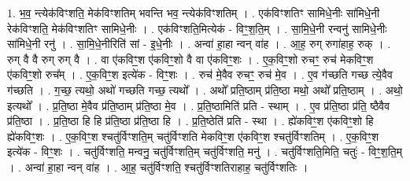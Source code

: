 \documentclass[17pt]{extarticle}
\begin{document}
1. भ॒व॒ न्त्येक॑विꣳशति॒ मेक॑विꣳशतिम् भवन्ति भव॒ न्त्येक॑विꣳशतिम् । . एक॑विꣳशतिꣳ सामिधे॒नीः सा॑मिधे॒नी रेक॑विꣳशति॒ मेक॑विꣳशतिꣳ सामिधे॒नीः । . एक॑विꣳशति॒मित्येक॑ - विꣳ॒॒श॒ति॒म् । . सा॒मि॒धे॒नी रन्वनु॑ सामिधे॒नीः सा॑मिधे॒नी रनु॑ । . सा॒मि॒धे॒नीरिति॑ सां - इ॒धे॒नीः । . अन्वा॑ हा॒हा न्वन् वा॑ह । . आ॒ह॒ रुग् रुगा॑हाह॒ रुक् । . रुग् वै वै रुग् रुग् वै । . वा ए॑कविꣳ॒॒श ए॑कविꣳ॒॒शो वै वा ए॑कविꣳ॒॒शः । . ए॒क॒विꣳ॒॒शो रुचꣳ॒॒ रुच॑ मेकविꣳ॒॒श ए॑कविꣳ॒॒शो रुच᳚म् । . ए॒क॒विꣳ॒॒श इत्ये॑क - विꣳ॒॒शः । . रुच॑ मे॒वैव रुचꣳ॒॒ रुच॑ मे॒व । . ए॒व ग॑च्छति गच्छ त्ये॒वैव ग॑च्छति । . ग॒च्छ॒ त्यथो॒ अथो॑ गच्छति गच्छ॒ त्यथो᳚ । . अथो᳚ प्रति॒ष्ठाम् प्र॑ति॒ष्ठा मथो॒ अथो᳚ प्रति॒ष्ठाम् । . अथो॒ इत्यथो᳚ । . प्र॒ति॒ष्ठा मे॒वैव प्र॑ति॒ष्ठाम् प्र॑ति॒ष्ठा मे॒व । . प्र॒ति॒ष्ठामिति॑ प्रति - स्थाम् । . ए॒व प्र॑ति॒ष्ठा प्र॑ति॒ ष्ठैवैव प्र॑ति॒ष्ठा । . प्र॒ति॒ष्ठा हि हि प्र॑ति॒ष्ठा प्र॑ति॒ष्ठा हि । . प्र॒ति॒ष्ठेति॑ प्रति - स्था । . ह्ये॑कविꣳ॒॒श ए॑कविꣳ॒॒शो हि ह्ये॑कविꣳ॒॒शः । . ए॒क॒विꣳ॒॒श श्चतु॑र्विꣳशति॒म् चतु॑र्विꣳशति मेकविꣳ॒॒श ए॑कविꣳ॒॒श श्चतु॑र्विꣳशतिम् । . ए॒क॒विꣳ॒॒श इत्ये॑क - विꣳ॒॒शः । . चतु॑र्विꣳशति॒ मन्वनु॒ चतु॑र्विꣳशति॒म् चतु॑र्विꣳशति॒ मनु॑ । . चतु॑र्विꣳशति॒मिति॒ चतुः॑ - विꣳ॒॒श॒ति॒म् । . अन्वा॑ हा॒हा न्वन् वा॑ह । . आ॒ह॒ चतु॑र्विꣳशति॒ श्चतु॑र्विꣳशतिराहाह॒ चतु॑र्विꣳशतिः । \newline
\end{document}
